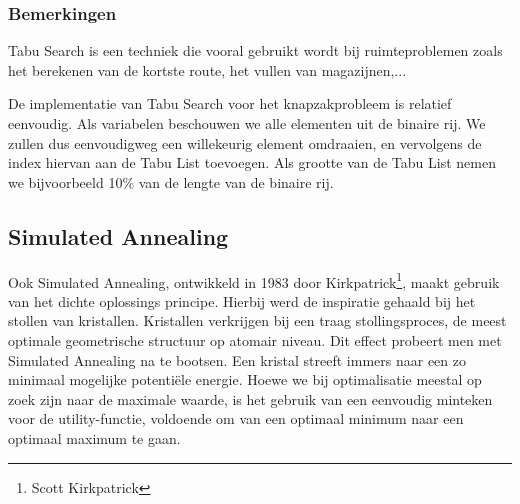\subsubsection{Bemerkingen} Tabu Search is een techniek die vooral gebruikt wordt bij ruimteproblemen zoals het berekenen van de kortste route, het vullen van magazijnen,...
\begin{leftbar}
De implementatie van Tabu Search voor het knapzakprobleem is relatief eenvoudig. Als variabelen beschouwen we alle elementen uit de binaire rij. We zullen dus eenvoudigweg een willekeurig element omdraaien, en vervolgens de index hiervan aan de Tabu List toevoegen. Als grootte van de Tabu List nemen we bijvoorbeeld 10\% van de lengte van de binaire rij.
\end{leftbar}
\subsection{Simulated Annealing}
\label{ss:simulatedAnnealing}
Ook Simulated Annealing, ontwikkeld in 1983 door Kirkpatrick\footnote{Scott Kirkpatrick}, maakt gebruik van het dichte oplossings principe. Hierbij werd de inspiratie gehaald bij het stollen van kristallen. Kristallen verkrijgen bij een traag stollingsproces, de meest optimale geometrische structuur op atomair niveau. Dit effect probeert men met Simulated Annealing na te bootsen. Een kristal streeft immers naar een zo minimaal mogelijke potentiële energie. Hoewe we bij optimalisatie meestal op zoek zijn naar de maximale waarde, is het gebruik van een eenvoudig minteken voor de utility-functie, voldoende om van een optimaal minimum naar een optimaal maximum te gaan.
